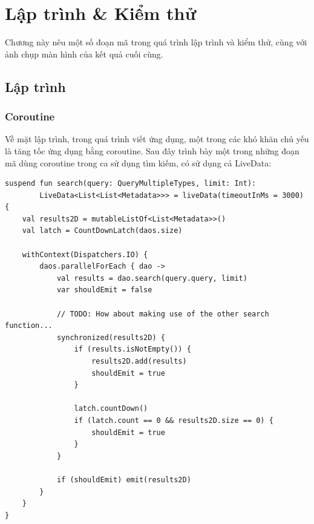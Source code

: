 \documentclass[../../thesis]{subfiles}
\begin{document}
\chapter{Lập trình \& Kiểm thử}\label{chap:implementation}

Chương này nêu một số đoạn mã trong quá trình lập trình và kiểm thử, cùng với
ảnh chụp màn hình của kết quả cuối cùng.



\section{Lập trình}\label{sec:coding}

\subsection{Coroutine}

Về mặt lập trình, trong quá trình viết ứng dụng, một trong các khó khăn chủ yếu
là tăng tốc ứng dụng bằng coroutine. Sau đây trình bày một trong những đoạn mã
dùng coroutine trong ca sử dụng tìm kiếm, có sử dụng cả LiveData:

\begin{verbatim}
suspend fun search(query: QueryMultipleTypes, limit: Int):
        LiveData<List<List<Metadata>>> = liveData(timeoutInMs = 3000) {
    val results2D = mutableListOf<List<Metadata>>()
    val latch = CountDownLatch(daos.size)

    withContext(Dispatchers.IO) {
        daos.parallelForEach { dao ->
            val results = dao.search(query.query, limit)
            var shouldEmit = false

            // TODO: How about making use of the other search function...
            synchronized(results2D) {
                if (results.isNotEmpty()) {
                    results2D.add(results)
                    shouldEmit = true
                }

                latch.countDown()
                if (latch.count == 0 && results2D.size == 0) {
                    shouldEmit = true
                }
            }

            if (shouldEmit) emit(results2D)
        }
    }
}

\end{verbatim}
\end{document}
